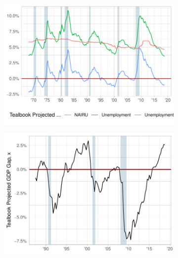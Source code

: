 \documentclass[11pt,pdf,aspectratio=129]{beamer}
\begin{document}
    \begin{frame}
        \begin{figure}\centering
            \begin{subfigure}[b]{0.46\textwidth}\centering
            \includegraphics[width=\textwidth]{expected_unemployment_plot.pdf}
            \end{subfigure}%
            \begin{subfigure}[b]{0.46\textwidth}\centering
            \includegraphics[width=\textwidth]{expected_gap_plot.pdf}
            \end{subfigure}
            \begin{subfigure}[b]{0.46\textwidth}\centering

\end{subfigure}
\end{figure}
\end{frame}
\end{document}
